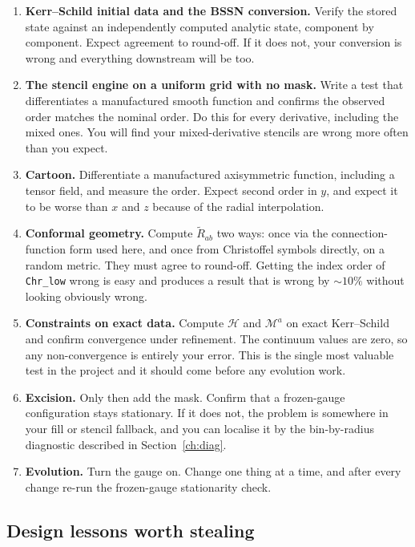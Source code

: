 \begin{enumerate}
\item \textbf{Kerr--Schild initial data and the BSSN conversion.} Verify the
      stored state against an independently computed analytic state,
      component by component. Expect agreement to round-off. If it does not,
      your conversion is wrong and everything downstream will be too.
\item \textbf{The stencil engine on a uniform grid with no mask.} Write a test
      that differentiates a manufactured smooth function and confirms the
      observed order matches the nominal order. Do this for every derivative,
      including the mixed ones. You will find your mixed-derivative stencils
      are wrong more often than you expect.
\item \textbf{Cartoon.} Differentiate a manufactured axisymmetric function,
      including a tensor field, and measure the order. Expect second order in
      $y$, and expect it to be worse than $x$ and $z$ because of the radial
      interpolation.
\item \textbf{Conformal geometry.} Compute $\tilde{R}_{ab}$ two ways: once via
      the connection-function form used here, and once from Christoffel symbols
      directly, on a random metric. They must agree to round-off. Getting the
      index order of \texttt{Chr\_low} wrong is easy and produces a result that
      is wrong by $\sim 10\%$ without looking obviously wrong.
\item \textbf{Constraints on exact data.} Compute $\mathcal{H}$ and
      $\mathcal{M}^a$ on exact Kerr--Schild and confirm convergence under
      refinement. The continuum values are zero, so any non-convergence is
      entirely your error. This is the single most valuable test in the
      project and it should come before any evolution work.
\item \textbf{Excision.} Only then add the mask. Confirm that a frozen-gauge
      configuration stays stationary. If it does not, the problem is
      somewhere in your fill or stencil fallback, and you can localise it by
      the bin-by-radius diagnostic described in Section~\ref{ch:diag}.
\item \textbf{Evolution.} Turn the gauge on. Change one thing at a time, and
      after every change re-run the frozen-gauge stationarity check.
\end{enumerate}

\subsection{Design lessons worth stealing}

